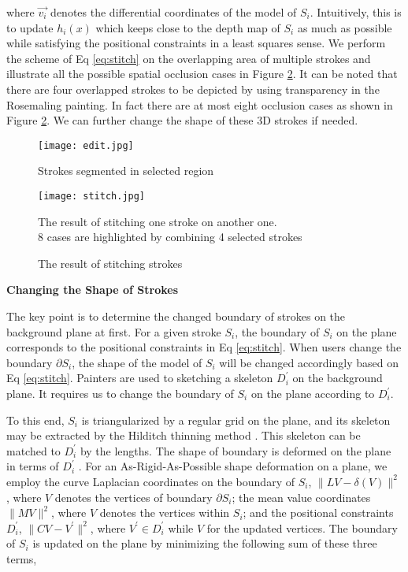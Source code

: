 where $\vec{v_i} $ denotes the differential coordinates of the model of $S_i$. Intuitively, this is to update $ h_i(x)$ which keeps close to the depth map of $S_i$ as much as possible while satisfying the positional constraints in a least squares sense. We perform the scheme of Eq \ref{eq:stitch} on the overlapping area of multiple strokes and illustrate all the possible spatial occlusion cases in Figure \ref{stitch}. It can be noted that there are four overlapped strokes to be depicted by using transparency in the Rosemaling painting. In fact there are at most eight occlusion cases as shown in Figure \ref{stitch}. We can further change the shape of these 3D strokes if needed.\newline

\begin{figure}[H]
	\centering
	\texttt{[image: edit.jpg]}
	\caption{Strokes segmented in selected region}
	\label{shape_edit}
\end{figure}

\begin{figure}[H]
	\centering
	\texttt{[image: stitch.jpg]}
	\caption{ The result of stitching strokes}
	\label{stitch}
	\medskip
 The result of stitching one stroke on another one. \\8 cases are highlighted by combining 4 selected strokes 
\end{figure}

\textbf{Changing the Shape of Strokes} 
\newline 

The key point is to determine the changed boundary of strokes on the background plane at first. For a given stroke $S_i$, the boundary of $S_i$ on the plane corresponds to the positional constraints in Eq \ref{eq:stitch}. When users change the boundary $\partial S_i $, the shape of the model of $S_i$ will be changed accordingly based on Eq \ref{eq:stitch}. Painters are used to sketching a skeleton $D_i^{'}$ on the background plane. It requires us to change the boundary of $S_i$ on the plane according to $D_i^{'}$.

To this end, $S_i$ is triangularized by a regular grid on the plane, and its skeleton may be extracted by the Hilditch thinning method \cite{cornea2007curve}. This skeleton can be matched to  $D_i^{'}$ by the lengths. The shape of boundary is deformed on the plane in terms of  $D_i^{'}$ . For an As-Rigid-As-Possible shape deformation \cite{weng20062d} on a plane, we employ the curve Laplacian coordinates on the boundary of $S_i$, $\lVert LV-\delta(V) \rVert ^2 $, where $V$ denotes the vertices of boundary $ \partial S_i $; the mean value coordinates $ \lVert MV \rVert^2 $, where $V$ denotes the vertices within $S_i$; and the positional constraints $D_i^{'}$, $\lVert CV-V^{'} \rVert ^2 $, where $V^{'} \in D_i^{'} $ while $V$ for the updated vertices. The boundary of $S_i$ is updated on the plane by minimizing the following sum of these three terms,

